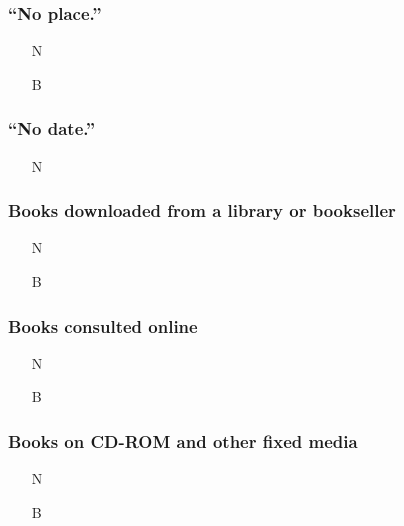\documentclass[11pt,letterpaper,oneside]{article}
\begin{document}
\setcounter{subsubsection}{137}
\subsubsection{``No place.''}

\begin{itemize}
\item[N] 

\item[B] 
\end{itemize}

\setcounter{subsubsection}{151}
\subsubsection{``No date.''}

\begin{itemize}
\item[N] 
\end{itemize}

\setcounter{subsubsection}{165}
\subsubsection{Books downloaded from a library or bookseller}

\begin{itemize}
\item[N] 

\item[B] 
\end{itemize}

\subsubsection{Books consulted online}

\begin{itemize}
\item[N] 

\item[B] 
\end{itemize}

\subsubsection{Books on CD-ROM and other fixed media}

\begin{itemize}
\item[N] 

\item[B] 
\end{itemize}
\end{document}
